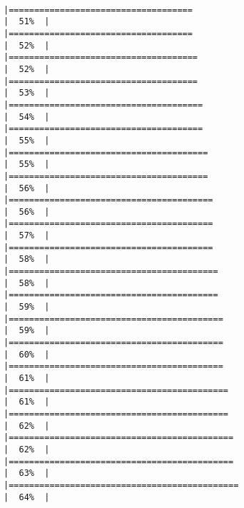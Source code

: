 \documentclass[12pt,twoside]{reedthesis}
\begin{document}
\begin{verbatim}
                                                                         |====================================                                  |  51%  |                                                                              |====================================                                  |  52%  |                                                                              |=====================================                                 |  52%  |                                                                              |=====================================                                 |  53%  |                                                                              |======================================                                |  54%  |                                                                              |======================================                                |  55%  |                                                                              |=======================================                               |  55%  |                                                                              |=======================================                               |  56%  |                                                                              |========================================                              |  56%  |                                                                              |========================================                              |  57%  |                                                                              |========================================                              |  58%  |                                                                              |=========================================                             |  58%  |                                                                              |=========================================                             |  59%  |                                                                              |==========================================                            |  59%  |                                                                              |==========================================                            |  60%  |                                                                              |==========================================                            |  61%  |                                                                              |===========================================                           |  61%  |                                                                              |===========================================                           |  62%  |                                                                              |============================================                          |  62%  |                                                                              |============================================                          |  63%  |                                                                              |=============================================                         |  64%  |      
\end{verbatim}
\end{document}

